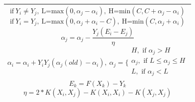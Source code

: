 \begin{table}[H]
	\small
	\begin{adjustbox}{width=1\textwidth}
	\begin{tabular}{|p{13.55cm}|}
		\hline
		\begin{equation}
		\textrm{if}\ Y_i \neq Y_j,\ \textrm{L=max}(0,\alpha_j-\alpha_i),\ \textrm{H=min}(C,C+\alpha_j-\alpha_i)
		\end{equation}
		\begin{equation}
		\textrm{if}\ Y_i = Y_j,\ \textrm{L=max}(0,\alpha_j+\alpha_i-C),\ \textrm{H=min}(C,\alpha_j+\alpha_i)
		\end{equation}
		\begin{equation}
		\alpha_j = \alpha_j - \frac{Y_j(E_i-E_j)}{\eta}	
		\end{equation}
		\begin{equation}
		\alpha_i = \alpha_i + Y_i Y_j(\alpha_j(old)-\alpha_i),\ \alpha _{j}= 
		\bigg\{ 
		\begin{gathered}
		H, \textrm{ if } \alpha_{j}>H \\
		\alpha_{j}, \textrm{ if } L\le \alpha _{j}\le H \\
		L, \textrm{ if } \alpha_{j}<L \\
		\end{gathered}
		\end{equation}
		\begin{equation}
		E_k=F(X_k)- Y_k
		\end{equation}
		\begin{equation}
		\eta=2*K(X_i,X_j )-K(X_i,X_i )-K(X_j,X_j)
		\end{equation}\\
		\hline
	\end{tabular}
	\end{adjustbox}
\end{table}

